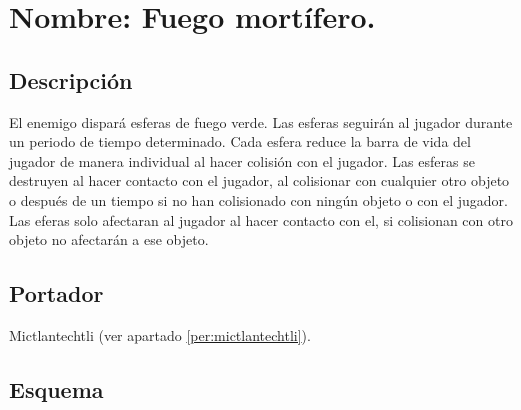 \section{Nombre: Fuego mortífero.} \label{hab.FuegoMor}
\subsection{Descripción}
El enemigo dispará esferas de fuego verde. Las esferas seguirán al jugador durante un periodo de tiempo determinado. Cada esfera reduce la barra de vida del jugador de manera individual al hacer colisión con el jugador. Las esferas se destruyen al hacer contacto con el jugador, al colisionar con cualquier otro objeto o después de un tiempo si no han colisionado con ningún objeto o con el jugador. Las eferas solo afectaran al jugador al hacer contacto con el, si colisionan con otro objeto no afectarán a ese objeto. 
\subsection{Portador}
Mictlantechtli (ver apartado \ref{per:mictlantechtli}).	
\subsection{Esquema}	
			